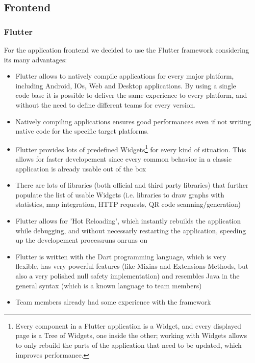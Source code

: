 \subsection{Frontend}
\subsubsection{Flutter}

For the application frontend we decided to use the Flutter framework considering its many advantages:
\begin{itemize}
    \item Flutter allows to natively compile applications for every major platform, including Android, IOs, Web and Desktop applications. By using a single code base it is possible to deliver the same experience to every platform, and without the need to define different teams for every version.
    \item Natively compiling applications ensures good performances even if not writing native code for the specific target platforms.
    \item Flutter provides lots of predefined Widgets\footnote{Every component in a Flutter application is a Widget, and every displayed page is a Tree of Widgets, one inside the other; working with Widgets allows to only rebuild the parts of the application that need to be updated, which improves performance.} for every kind of situation. This allows for faster developement since every common behavior in a classic application is already usable out of the box
    \item There are lots of libraries (both official and third party libraries) that further populate the list of usable Widgets (i.e. libraries to draw graphs with statistics, map integration, HTTP requests, QR code scanning/generation)
    \item Flutter allows for 'Hot Reloading', which instantly rebuilds the application while debugging, and without necessarly restarting the application, speeding up the developement processruns onruns on
    \item Flutter is written with the Dart programming language, which is very flexible, has very powerful features (like Mixins and Extensions Methods, but also a very polished null safety implementation) and resembles Java in the general syntax (which is a known language to team members)
    \item Team members already had some experience with the framework
\end{itemize}

